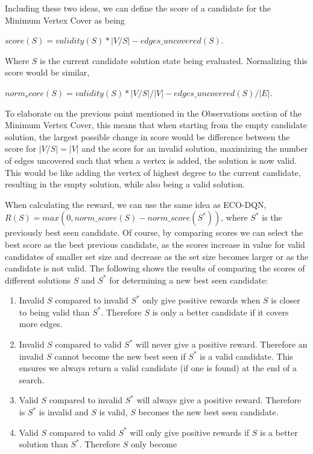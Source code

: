 \documentclass{article}
\begin{document}
Including these two ideas, we can define the score of a candidate for the Minimum Vertex Cover as being 

$score(S) = validity(S) * |V / S| - edges\_uncovered(S)$. 

Where $S$ is the current candidate solution state being evaluated. Normalizing this score would be similar,

$norm_score(S) = validity(S) * |V / S| / |V| - edges\_uncovered(S) / |E|$. 

To elaborate on the previous point mentioned in the Observations section of the Minimum Vertex Cover, this means that when starting from the empty candidate solution, the largest possible change in score would be difference between the score for $|V / S| = |V|$ and the score for an invalid solution, maximizing the number of edges uncovered such that when a vertex is added, the solution is now valid. This would be like adding the vertex of highest degree to the current candidate, resulting in the empty solution, while also being a valid solution. 

When calculating the reward, we can use the same idea as ECO-DQN, $R(S) = max(0, norm\_score(S) - norm\_score(S^*))$, where $S^*$ is the previously best seen candidate. Of course, by comparing scores we can select the best score as the best previous candidate, as the scores increase in value for valid candidates of smaller set size and decrease as the set size becomes larger or as the candidate is not valid. The following shows the results of comparing the scores of different solutions $S$ and $S^*$ for determining a new best seen candidate:

\begin{enumerate}
    \item Invalid $S$ compared to invalid $S^*$ only give positive rewards when $S$ is closer to being valid than $S^*$. Therefore $S$ is only a better candidate if it covers more edges.
    \item Invalid $S$ compared to valid $S^*$ will never give a positive reward. Therefore an invalid $S$ cannot become the new best seen if $S^*$ is a valid candidate. This ensures we always return a valid candidate (if one is found) at the end of a search.
    \item Valid $S$ compared to invalid $S^*$ will always give a positive reward. Therefore is $S^*$ is invalid and $S$ is valid, $S$ becomes the new best seen candidate.
    \item Valid $S$ compared to valid $S^*$ will only give positive rewards if $S$ is a better solution than $S^*$. Therefore $S$ only become
\end{enumerate}
\end{document}
